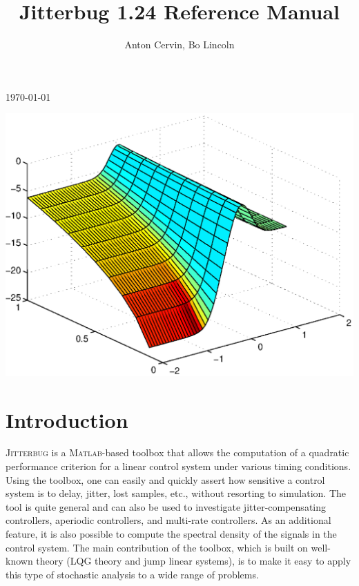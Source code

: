 \documentclass[final,twoside]{rapport}  %
\begin{document}
\thispagestyle{empty}
\setlength{\parindent}{0pt}
\setlength{\parskip}{1em plus 0.1em minus 0.1em}

\begin{paperhead}
\title{Jitterbug 1.24 Reference Manual}
\today
\author{\normalsize Anton Cervin, Bo Lincoln}
\address{Department of Automatic Control, LTH \\ Lund University \\  Box 118, SE 221 00 Lund, Sweden \\
{\tt \{anton,lincoln\}@control.lth.se}} 
\end{paperhead}

\includegraphics[width=\hsize]{cover.eps}

\newpage

\tableofcontents

\section{Introduction}

\textsc{Jitterbug} \cite{lin+02} is a \textsc{Matlab}-based toolbox
that allows the computation of a quadratic performance criterion for a
linear control system under various timing conditions. Using the
toolbox, one can easily and quickly assert how sensitive a control
system is to delay, jitter, lost samples, etc., without resorting to
simulation. The tool is quite general and can also be used to
investigate jitter-compensating controllers, aperiodic controllers,
and multi-rate controllers. As an additional feature, it is also
possible to compute the spectral density of the signals in the control
system. The main contribution of the toolbox, which is built on
well-known theory (LQG theory and jump linear systems), is to make it
easy to apply this type of stochastic analysis to a wide range of
problems.
\end{document}
